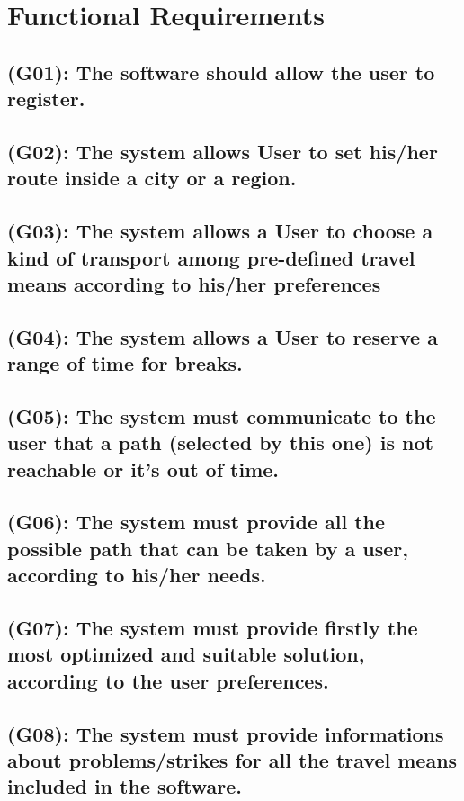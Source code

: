 \documentclass[a4paper,leqno]{book}
\begin{document}
\section{Functional Requirements}
\subsection{(G01): The software should allow the user to register.}

\subsection{(G02): The system allows User to set his/her route inside a city or a region.}

\subsection{(G03): The system allows a User to choose a kind of transport among pre-defined travel means according to his/her preferences}

\subsection {(G04): The system allows a User to reserve a range of time for breaks.}

\subsection{(G05): The system must communicate to the user that a path (selected by this one) is not reachable or it's out of time.}

\subsection{(G06): The system must provide all the possible path that can be taken by a user, according to his/her needs.}

\subsection{(G07): The system must provide firstly the most optimized and suitable solution, according to the user preferences.}

\subsection  {(G08): The system must provide informations about problems/strikes for all the travel means  included in the software.}
\end{document}
